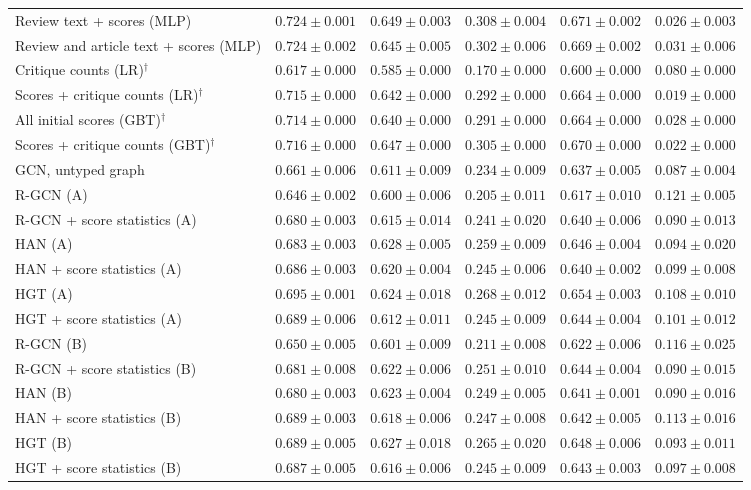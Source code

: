 \begin{table}[t]
\begin{tabular}{lccccc}
Review text + scores (MLP) & $0.724 \pm 0.001$ & $0.649 \pm 0.003$ & $0.308 \pm 0.004$ & $0.671 \pm 0.002$ & $0.026 \pm 0.003$ \\
Review and article text + scores (MLP) & $0.724 \pm 0.002$ & $0.645 \pm 0.005$ & $0.302 \pm 0.006$ & $0.669 \pm 0.002$ & $0.031 \pm 0.006$ \\
Critique counts (LR)$^{\dagger}$ & $0.617 \pm 0.000$ & $0.585 \pm 0.000$ & $0.170 \pm 0.000$ & $0.600 \pm 0.000$ & $0.080 \pm 0.000$ \\
Scores + critique counts (LR)$^{\dagger}$ & $0.715 \pm 0.000$ & $0.642 \pm 0.000$ & $0.292 \pm 0.000$ & $0.664 \pm 0.000$ & $0.019 \pm 0.000$ \\
All initial scores (GBT)$^{\dagger}$ & $0.714 \pm 0.000$ & $0.640 \pm 0.000$ & $0.291 \pm 0.000$ & $0.664 \pm 0.000$ & $0.028 \pm 0.000$ \\
Scores + critique counts (GBT)$^{\dagger}$ & $0.716 \pm 0.000$ & $0.647 \pm 0.000$ & $0.305 \pm 0.000$ & $0.670 \pm 0.000$ & $0.022 \pm 0.000$ \\
GCN, untyped graph & $0.661 \pm 0.006$ & $0.611 \pm 0.009$ & $0.234 \pm 0.009$ & $0.637 \pm 0.005$ & $0.087 \pm 0.004$ \\
R-GCN (A) & $0.646 \pm 0.002$ & $0.600 \pm 0.006$ & $0.205 \pm 0.011$ & $0.617 \pm 0.010$ & $0.121 \pm 0.005$ \\
R-GCN + score statistics (A) & $0.680 \pm 0.003$ & $0.615 \pm 0.014$ & $0.241 \pm 0.020$ & $0.640 \pm 0.006$ & $0.090 \pm 0.013$ \\
HAN (A) & $0.683 \pm 0.003$ & $0.628 \pm 0.005$ & $0.259 \pm 0.009$ & $0.646 \pm 0.004$ & $0.094 \pm 0.020$ \\
HAN + score statistics (A) & $0.686 \pm 0.003$ & $0.620 \pm 0.004$ & $0.245 \pm 0.006$ & $0.640 \pm 0.002$ & $0.099 \pm 0.008$ \\
HGT (A) & $0.695 \pm 0.001$ & $0.624 \pm 0.018$ & $0.268 \pm 0.012$ & $0.654 \pm 0.003$ & $0.108 \pm 0.010$ \\
HGT + score statistics (A) & $0.689 \pm 0.006$ & $0.612 \pm 0.011$ & $0.245 \pm 0.009$ & $0.644 \pm 0.004$ & $0.101 \pm 0.012$ \\
R-GCN (B) & $0.650 \pm 0.005$ & $0.601 \pm 0.009$ & $0.211 \pm 0.008$ & $0.622 \pm 0.006$ & $0.116 \pm 0.025$ \\
R-GCN + score statistics (B) & $0.681 \pm 0.008$ & $0.622 \pm 0.006$ & $0.251 \pm 0.010$ & $0.644 \pm 0.004$ & $0.090 \pm 0.015$ \\
HAN (B) & $0.680 \pm 0.003$ & $0.623 \pm 0.004$ & $0.249 \pm 0.005$ & $0.641 \pm 0.001$ & $0.090 \pm 0.016$ \\
HAN + score statistics (B) & $0.689 \pm 0.003$ & $0.618 \pm 0.006$ & $0.247 \pm 0.008$ & $0.642 \pm 0.005$ & $0.113 \pm 0.016$ \\
HGT (B) & $0.689 \pm 0.005$ & $0.627 \pm 0.018$ & $0.265 \pm 0.020$ & $0.648 \pm 0.006$ & $0.093 \pm 0.011$ \\
HGT + score statistics (B) & $0.687 \pm 0.005$ & $0.616 \pm 0.006$ & $0.245 \pm 0.009$ & $0.643 \pm 0.003$ & $0.097 \pm 0.008$ \\
\bottomrule
\end{tabular}
\end{table}
